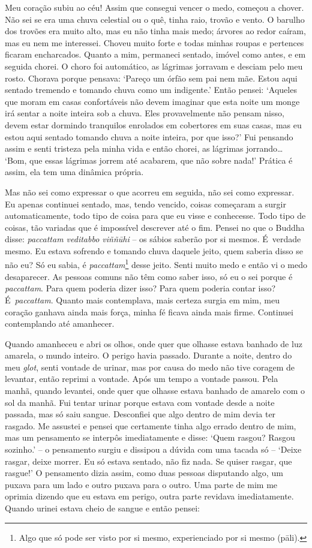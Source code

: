 Meu coração subiu ao céu! Assim que consegui vencer o medo, começou a
chover. Não sei se era uma chuva celestial ou o quê, tinha raio, trovão
e vento. O barulho dos trovões era muito alto, mas eu não tinha mais
medo; árvores ao redor caíram, mas eu nem me interessei. Choveu muito
forte e todas minhas roupas e pertences ficaram encharcados. Quanto a
mim, permaneci sentado, imóvel como antes, e em seguida chorei. O choro
foi automático, as lágrimas jorravam e desciam pelo meu rosto. Chorava
porque pensava: `Pareço um órfão sem pai nem mãe. Estou aqui sentado
tremendo e tomando chuva como um indigente.' Então pensei: `Aqueles que
moram em casas confortáveis não devem imaginar que esta noite um monge
irá sentar a noite inteira sob a chuva. Eles provavelmente não pensam
nisso, devem estar dormindo tranquilos enrolados em cobertores em suas
casas, mas eu estou aqui sentado tomando chuva a noite inteira, por que
isso?' Fui pensando assim e senti tristeza pela minha vida e então
chorei, as lágrimas jorrando\ldots{} `Bom, que essas lágrimas jorrem até
acabarem, que não sobre nada!' Prática é assim, ela tem uma dinâmica
própria.

Mas não sei como expressar o que acorreu em seguida, não sei como
expressar. Eu apenas continuei sentado, mas, tendo vencido, coisas
começaram a surgir automaticamente, todo tipo de coisa para que eu visse
e conhecesse. Todo tipo de coisas, tão variadas que é impossível
descrever até o fim. Pensei no que o Buddha disse: \emph{paccattam
veditabbo viññūhi} -- os sábios saberão por si mesmos. É~verdade mesmo.
Eu estava sofrendo e tomando chuva daquele jeito, quem saberia disso se
não eu? Só eu sabia, é \emph{paccattam}\footnote{Algo que só pode ser
  visto por si mesmo, experienciado por si mesmo (pāli).} desse jeito.
Senti muito medo e então vi o medo desaparecer. As pessoas comuns não
têm como saber isso, só eu o sei porque é \emph{paccattam}. Para quem
poderia dizer isso? Para quem poderia contar isso? É~\emph{paccattam}.
Quanto mais contemplava, mais certeza surgia em mim, meu coração ganhava
ainda mais força, minha fé ficava ainda mais firme. Continuei
contemplando até amanhecer.

Quando amanheceu e abri os olhos, onde quer que olhasse estava banhado
de luz amarela, o mundo inteiro. O perigo havia passado. Durante a
noite, dentro do meu \emph{glot}, senti vontade de urinar, mas por causa
do medo não tive coragem de levantar, então reprimi a vontade. Após um
tempo a vontade passou. Pela manhã, quando levantei, onde quer que
olhasse estava banhado de amarelo com o sol da manhã. Fui tentar urinar
porque estava com vontade desde a noite passada, mas só saiu sangue.
Desconfiei que algo dentro de mim devia ter rasgado. Me assustei e
pensei que certamente tinha algo errado dentro de mim, mas um pensamento
se interpôs imediatamente e disse: `Quem rasgou? Rasgou sozinho.' -- o
pensamento surgiu e dissipou a dúvida com uma tacada só -- `Deixe
rasgar, deixe morrer. Eu só estava sentado, não fiz nada. Se quiser
rasgar, que rasgue!' O pensamento dizia assim, como duas pessoas
disputando algo, um puxava para um lado e outro puxava para o outro. Uma
parte de mim me oprimia dizendo que eu estava em perigo, outra parte
revidava imediatamente. Quando urinei estava cheio de sangue e então
pensei:

